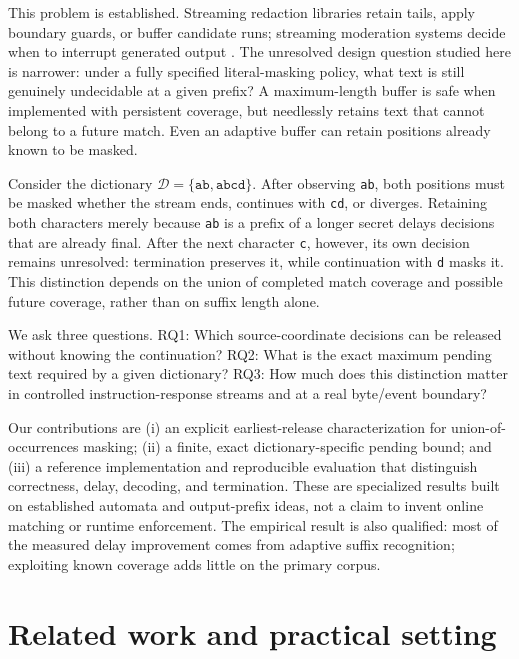 \documentclass[11pt,a4paper]{article}
\newcommand{\D}{\mathcal{D}}
\begin{document}
This problem is established. Streaming redaction libraries retain tails, apply boundary guards, or buffer candidate runs; streaming moderation systems decide when to interrupt generated output \cite{sether,adr,frost,sentguard,streamguard}. The unresolved design question studied here is narrower: under a fully specified literal-masking policy, what text is still genuinely undecidable at a given prefix? A maximum-length buffer is safe when implemented with persistent coverage, but needlessly retains text that cannot belong to a future match. Even an adaptive buffer can retain positions already known to be masked.

Consider the dictionary $\D=\{\texttt{ab},\texttt{abcd}\}$. After observing \texttt{ab}, both positions must be masked whether the stream ends, continues with \texttt{cd}, or diverges. Retaining both characters merely because \texttt{ab} is a prefix of a longer secret delays decisions that are already final. After the next character \texttt{c}, however, its own decision remains unresolved: termination preserves it, while continuation with \texttt{d} masks it. This distinction depends on the union of completed match coverage and possible future coverage, rather than on suffix length alone.

We ask three questions. RQ1: Which source-coordinate decisions can be released without knowing the continuation? RQ2: What is the exact maximum pending text required by a given dictionary? RQ3: How much does this distinction matter in controlled instruction-response streams and at a real byte/event boundary?

Our contributions are (i) an explicit earliest-release characterization for union-of-occurrences masking; (ii) a finite, exact dictionary-specific pending bound; and (iii) a reference implementation and reproducible evaluation that distinguish correctness, delay, decoding, and termination. These are specialized results built on established automata and output-prefix ideas, not a claim to invent online matching or runtime enforcement. The empirical result is also qualified: most of the measured delay improvement comes from adaptive suffix recognition; exploiting known coverage adds little on the primary corpus.

\section{Related work and practical setting}
\end{document}
